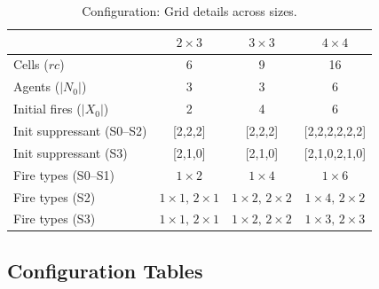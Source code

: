 \begin{table} [h]
\centering
\small
\setlength{\tabcolsep}{2.5pt}
\renewcommand{\arraystretch}{1.05}
\begin{tabular}{l|c|c|c}
\toprule
 & $2\times 3$ & $3\times 3$ & $4\times 4$ \\
\midrule
Cells ($rc$)                 & 6  & 9  & 16 \\
Agents ($|N_0|$)             & 3  & 3  & 6 \\
Initial fires ($|X_0|$)      & 2  & 4  & 6 \\
Init suppressant (S0--S2)& [2,2,2] & [2,2,2] & [2,2,2,2,2,2] \\
Init suppressant (S3)   & [2,1,0] & [2,1,0] & [2,1,0,2,1,0] \\
Fire types (S0--S1)      & $1\times 2$ & $1\times 4$ & $1\times 6$ \\
Fire types (S2)         & $1\times 1,\,2\times 1$ & $1\times 2,\,2\times 2$ & $1\times 4,\,2\times 2$ \\
Fire types (S3)         & $1\times 1,\,2\times 1$ & $1\times 2,\,2\times 2$ & $1\times 3,\,2\times 3$ \\
\bottomrule
\end{tabular}

\caption{Configuration: Grid details across sizes.}
\label{tab:grid_minimal}
\end{table}


\subsection{Configuration Tables}\label{app:configuration_tables}





